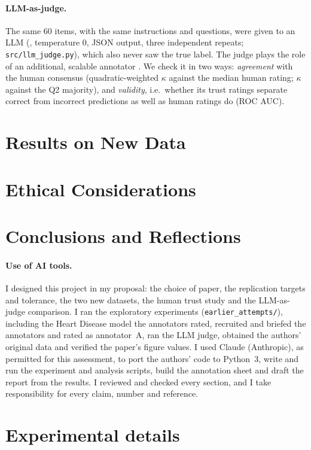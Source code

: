 \documentclass[11pt]{article}
\begin{document}
\paragraph{LLM-as-judge.} The same 60 items, with the same instructions and questions, were given to an LLM (\LLMModel{}, temperature 0, JSON output, three independent repeats; \texttt{src/llm\_judge.py}), which also never saw the true label. The judge plays the role of an additional, scalable annotator \citep{zheng2023}. We check it in two ways: \emph{agreement} with the human consensus (quadratic-weighted $\kappa$ against the median human rating; $\kappa$ against the Q2 majority), and \emph{validity}, i.e.\ whether its trust ratings separate correct from incorrect predictions as well as human ratings do (ROC AUC).

\section{Results on New Data}
\label{sec:newres}


\section{Ethical Considerations}
\label{sec:ethics}


\section{Conclusions and Reflections}
\label{sec:concl}


\paragraph{Use of AI tools.} I designed this project in my proposal: the choice of paper, the replication targets and tolerance, the two new datasets, the human trust study and the LLM-as-judge comparison. I ran the exploratory experiments (\texttt{earlier\_attempts/}), including the Heart Disease model the annotators rated, recruited and briefed the annotators and rated as annotator~A, ran the LLM judge, obtained the authors' original data and verified the paper's figure values. I used Claude (Anthropic), as permitted for this assessment, to port the authors' code to Python~3, write and run the experiment and analysis scripts, build the annotation sheet and draft the report from the results. I reviewed and checked every section, and I take responsibility for every claim, number and reference.



\appendix
\section{Experimental details}
\label{app:details}

\end{document}
